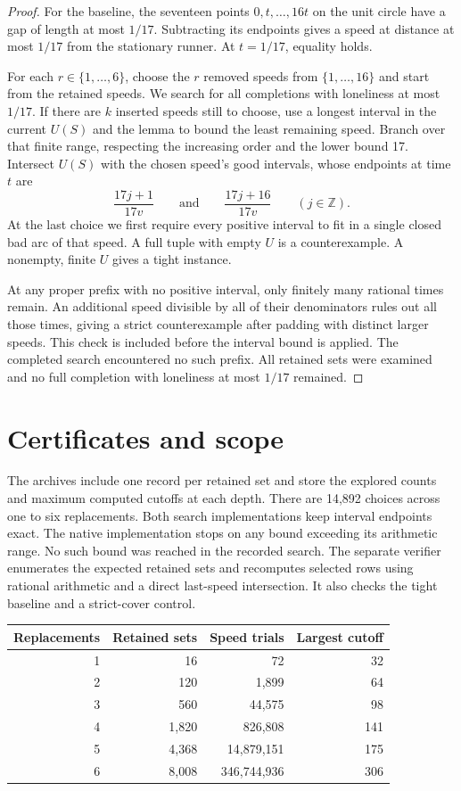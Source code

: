 \documentclass[10pt]{article}
\begin{document}
\begin{proof}
For the baseline, the seventeen points \(0,t,\ldots,16t\)
on the unit circle have a gap of length at most \(1/17\).
Subtracting its endpoints gives a speed at distance at most
\(1/17\) from the stationary runner. At \(t=1/17\), equality
holds.

For each \(r\in\{1,\ldots,6\}\), choose the \(r\) removed speeds
from \(\{1,\ldots,16\}\) and start from the retained speeds.
We search for all completions with loneliness at most \(1/17\).
If there are \(k\) inserted speeds still to choose, use a
longest interval in the current \(U(S)\) and the lemma to bound
the least remaining speed. Branch over that finite range,
respecting the increasing order and the lower bound 17.
Intersect \(U(S)\) with the chosen speed's good intervals,
whose endpoints at time \(t\) are
\[
 \frac{17j+1}{17v}\qquad\text{and}\qquad
 \frac{17j+16}{17v}\qquad(j\in\mathbb Z).
\]
At the last choice we first require every positive interval
to fit in a single closed bad arc of that speed. A full tuple
with empty \(U\) is a counterexample. A nonempty, finite \(U\)
gives a tight instance.

At any proper prefix with no positive interval, only finitely
many rational times remain. An additional speed divisible by
all of their denominators rules out all those times, giving
a strict counterexample after padding with distinct larger
speeds. This check is included before the interval bound is
applied. The completed search encountered no such prefix.
All retained sets were examined and no full completion
with loneliness at most \(1/17\) remained.
\end{proof}

\section{Certificates and scope}
The archives include one record per retained set and store the
explored counts and maximum computed cutoffs at each depth.
There are 14,892 choices across one to six replacements.
Both search implementations keep interval endpoints exact.
The native implementation stops on any bound exceeding its
arithmetic range. No such bound was reached in the recorded
search. The separate verifier enumerates the expected retained
sets and recomputes selected rows using rational arithmetic
and a direct last-speed intersection. It also checks the
tight baseline and a strict-cover control.

\begin{center}
\begin{tabular}{rrrr}
\toprule
Replacements & Retained sets & Speed trials & Largest cutoff \\
\midrule
1 & 16 & 72 & 32 \\
2 & 120 & 1,899 & 64 \\
3 & 560 & 44,575 & 98 \\
4 & 1,820 & 826,808 & 141 \\
5 & 4,368 & 14,879,151 & 175 \\
6 & 8,008 & 346,744,936 & 306 \\
\bottomrule
\end{tabular}
\end{center}
\end{document}
